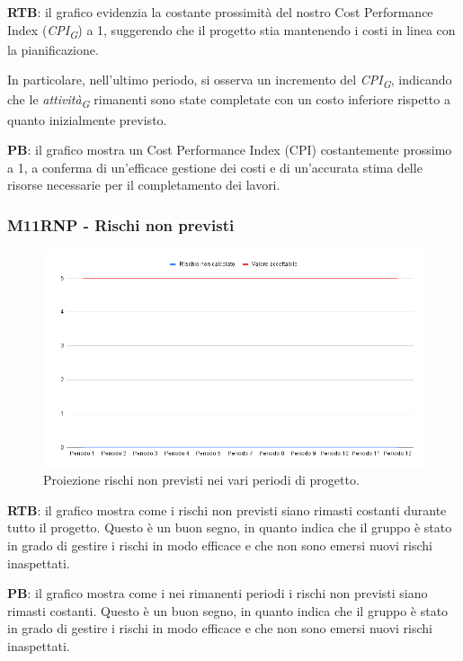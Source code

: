 \vspace{0.2cm}

\textbf{RTB}: il grafico evidenzia la costante prossimità del nostro Cost Performance Index (\textit{CPI}\textsubscript{\textit{G}}) a 1, suggerendo che il progetto stia mantenendo i costi in linea con la pianificazione.

\vspace{0.2cm}

In particolare, nell'ultimo periodo, si osserva un incremento del \textit{CPI}\textsubscript{\textit{G}}, indicando che le \textit{attività}\textsubscript{\textit{G}} rimanenti sono state completate con un costo inferiore rispetto a quanto inizialmente previsto.

\vspace{0.2cm}
\textbf{PB}: il grafico mostra un Cost Performance Index (CPI) costantemente prossimo a 1, a conferma di un'efficace gestione dei costi e di un'accurata stima delle risorse necessarie per il completamento dei lavori.

\subsubsection{M11RNP - Rischi non previsti}

\vspace{0.3cm}

\begin{figure}[H]
    \centering
    \includegraphics[width=1\textwidth]{../Images/PianoDiQualifica/M11RNP.png}
    \caption{Proiezione rischi non previsti nei vari periodi di progetto.}
    \label{fig:7}
\end{figure}

\vspace{0.2cm}

\textbf{RTB}: il grafico mostra come i rischi non previsti siano rimasti costanti durante tutto il progetto. Questo è un buon segno, in quanto indica che il gruppo è stato in grado di gestire i rischi in modo efficace e che non sono emersi nuovi rischi inaspettati.

\vspace{0.2cm}
\textbf{PB}: il grafico mostra come i nei rimanenti periodi i rischi non previsti siano rimasti costanti. Questo è un buon segno, in quanto indica che il gruppo è stato in grado di gestire i rischi in modo efficace e che non sono emersi nuovi rischi inaspettati.
